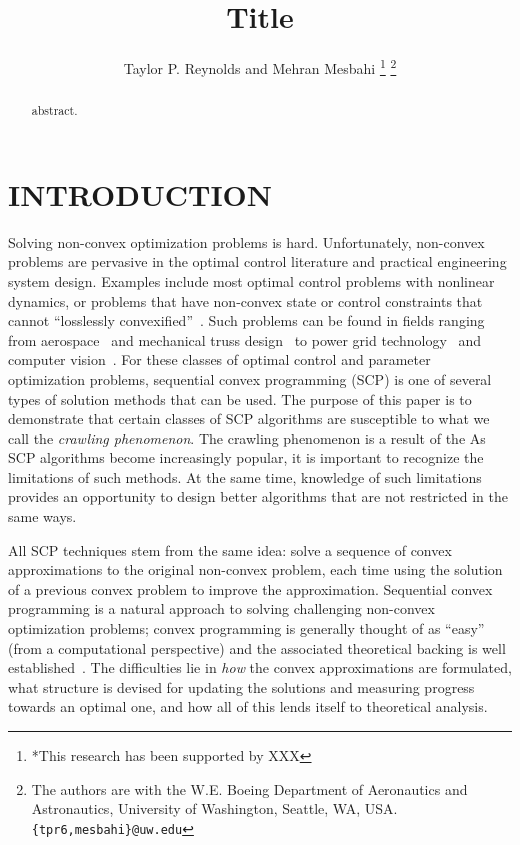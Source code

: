 \documentclass[letterpaper, 10 pt, conference]{ieeeconf}
\title{\LARGE \bf Title
}
\author{Taylor P. Reynolds and Mehran Mesbahi%
\thanks{*This research has been supported by XXX}%
\thanks{The authors are with the W.E. Boeing Department of Aeronautics and Astronautics,
        University of Washington, Seattle, WA, USA.
        {\tt\small \{tpr6,mesbahi\}@uw.edu}}%
}
\begin{document}
\maketitle
\thispagestyle{empty}
\pagestyle{empty}


\begin{abstract}

abstract.

\end{abstract}


\section{INTRODUCTION}\label{sec:intro}

Solving non-convex optimization problems is hard. Unfortunately, non-convex problems are pervasive in the optimal control literature and practical engineering system design. Examples include most optimal control problems with nonlinear dynamics, or problems that have non-convex state or control constraints that cannot ``losslessly convexified''~\cite{Acikmese2011,Blackmore2012b}. Such problems can be found in fields ranging from aerospace~\cite{SzmukReynolds2018,Lee2017,Liu2014} and mechanical truss design~\cite{Beck2010} to power grid technology~\cite{Wei2017} and computer vision~\cite{Jiang2007}. For these classes of optimal control and parameter optimization problems, sequential convex programming (SCP) is one of several types of solution methods that can be used. The purpose of this paper is to demonstrate that certain classes of SCP algorithms are susceptible to what we call the \textit{crawling phenomenon}. The crawling phenomenon is a result of the  As SCP algorithms become increasingly popular, it is important to recognize the limitations of such methods. At the same time, knowledge of such limitations provides an opportunity to design better algorithms that are not restricted in the same ways.

All SCP techniques stem from the same idea: solve a sequence of convex approximations to the original non-convex problem, each time using the solution of a previous convex problem to improve the approximation. Sequential convex programming is a natural approach to solving challenging non-convex optimization problems; convex programming is generally thought of as ``easy'' (from a computational perspective) and the associated theoretical backing is well established~\cite{Rockafellar1970,BoydBook}. The difficulties lie in \textit{how} the convex approximations are formulated, what structure is devised for updating the solutions and measuring progress towards an optimal one, and how all of this lends itself to theoretical analysis. 
\end{document}
